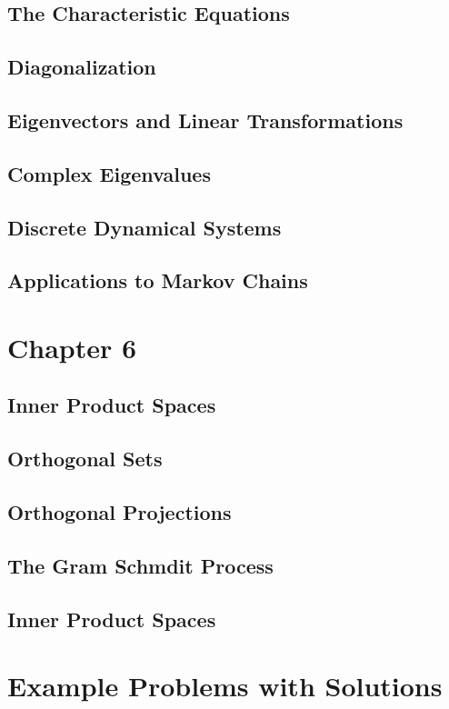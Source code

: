 \documentclass{article}
\begin{document}
\subsection{The Characteristic Equations}
\subsection{Diagonalization}
\subsection{Eigenvectors and Linear Transformations}
\subsection{Complex Eigenvalues}
\subsection{Discrete Dynamical Systems}
\subsection{Applications to Markov Chains}
\section{Chapter 6}
\subsection{Inner Product Spaces}
\subsection{Orthogonal Sets}
\subsection{Orthogonal Projections}
\subsection{The Gram Schmdit Process}
\subsection{Inner Product Spaces}




\pagebreak
\section{Example Problems with Solutions}
\end{document}
